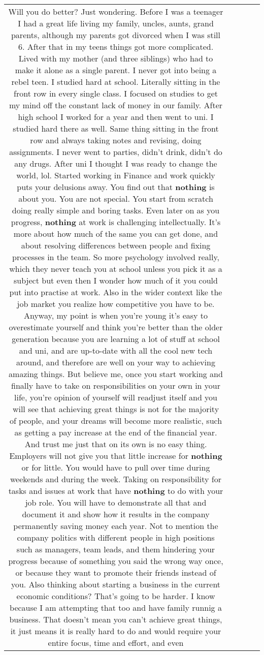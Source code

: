 \documentclass[11pt]{article}
\newlength\mylength
\begin{document}
\begin{center}
\begin{longtable}{|C{.65\mylength}|C{.30\mylength}|C{.12\mylength}|C{.12\mylength}|C{.12\mylength}|}
  \small Will you do better? Just wondering. Before I was a teenager I had a great life living my family, uncles, aunts, grand parents, although my parents got divorced when I was still 6. After that in my teens things got more complicated. Lived with my mother (and three siblings) who had to make it alone as a single parent. I never got into being a rebel teen. I studied hard at school. Literally sitting in the front row in every single class. I focused on studies to get my mind off the constant lack of money in our family. After high school I worked for a year and then went to uni. I studied hard there as well. Same thing sitting in the front row and always taking notes and revising, doing assignments. I never went to parties, didn't drink, didn't do any drugs. After uni I thought I was ready to change the world, lol. Started working in Finance and work quickly puts your delusions away. You find out that \textbf{nothing} is about you. You are not special. You start from scratch doing really simple and boring tasks. Even later on as you progress, \textbf{nothing} at work is challenging intellectually. It's more about how much of the same you can get done, and about resolving differences between people and fixing processes in the team. So more psychology involved really, which they never teach you at school unless you pick it as a subject but even then I wonder how much of it you could put into practise at work. Also in the wider context like the job market you realize how competitive you have to be. Anyway, my point is when you're young it's easy to overestimate yourself and think you're better than the older generation because you are learning a lot of stuff at school and uni, and are up-to-date with all the cool new tech around, and therefore are well on your way to achieving amazing things. But believe me, once you start working and finally have to take on responsibilities on your own in your life, you're opinion of yourself will readjust itself and you will see that achieving great things is not for the majority of people, and your dreams will become more realistic, such as getting a pay increase at the end of the financial year. And trust me just that on its own is no easy thing. Employers will not give you that little increase for \textbf{nothing} or for little. You would have to pull over time during weekends and during the week. Taking on responsibility for tasks and issues at work that have \textbf{nothing} to do with your job role. You will have to demonstrate all that and document it and show how it results in the company permanently saving money each year. Not to mention the company politics with different people in high positions such as managers, team leads, and them hindering your progress because of something you said the wrong way once, or because they want to promote their friends instead of you. Also thinking about starting a business in the current economic conditions? That's going to be harder. I know because I am attempting that too and have family runnig a business. That doesn't mean you can't achieve great things, it just means it is really hard to do and would require your entire focus, time and effort, and even 
\end{longtable}
\end{center}
\end{document}
